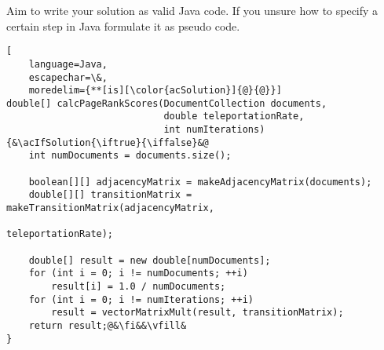\documentclass[exam, sectionseven]{acAssignment}
\begin{document}
Aim to write your solution as valid Java code.
If you unsure how to specify a certain step in Java formulate it as pseudo code.

\clearpage
\begin{lstlisting}[
    language=Java,
    escapechar=\&,
    moredelim={**[is][\color{acSolution}]{@}{@}}]
double[] calcPageRankScores(DocumentCollection documents,
                            double teleportationRate,
                            int numIterations) {&\acIfSolution{\iftrue}{\iffalse}&@
    int numDocuments = documents.size();
    
    boolean[][] adjacencyMatrix = makeAdjacencyMatrix(documents);
    double[][] transitionMatrix = makeTransitionMatrix(adjacencyMatrix,
                                                       teleportationRate);
    
    double[] result = new double[numDocuments];
    for (int i = 0; i != numDocuments; ++i)
        result[i] = 1.0 / numDocuments;
    for (int i = 0; i != numIterations; ++i)
        result = vectorMatrixMult(result, transitionMatrix);
    return result;@&\fi&&\vfill&
}
\end{lstlisting}


\end{document}
